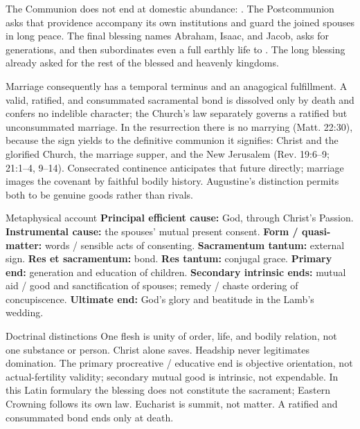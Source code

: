 The Communion does not end at domestic abundance: . The Postcommunion asks that providence accompany its own institutions and guard the joined spouses in long peace. The final blessing names Abraham, Isaac, and Jacob, asks for generations, and then subordinates even a full earthly life to . The long blessing already asked for the rest of the blessed and heavenly kingdoms.

Marriage consequently has a temporal terminus and an anagogical fulfillment. A valid, ratified, and consummated sacramental bond is dissolved only by death and confers no indelible character; the Church's law separately governs a ratified but unconsummated marriage. In the resurrection there is no marrying (Matt. 22:30), because the sign yields to the definitive communion it signifies: Christ and the glorified Church, the marriage supper, and the New Jerusalem (Rev. 19:6--9; 21:1--4, 9--14). Consecrated continence anticipates that future directly; marriage images the covenant by faithful bodily history. Augustine's distinction permits both to be genuine goods rather than rivals.

\begin{studybox}{Metaphysical account}
\textbf{Principal efficient cause:} God, through Christ's Passion. \textbf{Instrumental cause:} the spouses' mutual present consent. \textbf{Form / quasi-matter:} words / sensible acts of consenting. \textbf{Sacramentum tantum:} external sign. \textbf{Res et sacramentum:} bond. \textbf{Res tantum:} conjugal grace. \textbf{Primary end:} generation and education of children. \textbf{Secondary intrinsic ends:} mutual aid / good and sanctification of spouses; remedy / chaste ordering of concupiscence. \textbf{Ultimate end:} God's glory and beatitude in the Lamb's wedding.
\end{studybox}

\begin{studybox}{Doctrinal distinctions}
One flesh is unity of order, life, and bodily relation, not one substance or person. Christ alone saves. Headship never legitimates domination. The primary procreative / educative end is objective orientation, not actual-fertility validity; secondary mutual good is intrinsic, not expendable. In this Latin formulary the blessing does not constitute the sacrament; Eastern Crowning follows its own law. Eucharist is summit, not matter. A ratified and consummated bond ends only at death.
\end{studybox}
\endgroup
